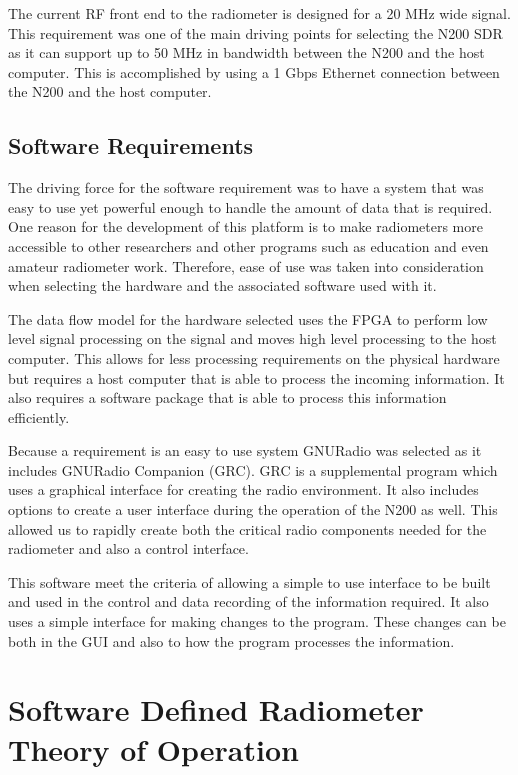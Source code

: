 The current RF front end to the radiometer is designed for a 20 MHz wide signal.  This requirement was one of the main driving points for selecting the N200 SDR as it can support up to 50 MHz in bandwidth between the N200 and the host computer.  This is accomplished by using a 1 Gbps Ethernet connection between the N200 and the host computer.

\subsection{Software Requirements}

The driving force for the software requirement was to have a system that was easy to use yet powerful enough to handle the amount of data that is required.  One reason for the development of this platform is to make radiometers more accessible to other researchers and other programs such as education and even amateur radiometer work.  Therefore, ease of use was taken into consideration when selecting the hardware and the associated software used with it.

The data flow model for the hardware selected uses the FPGA to perform low level signal processing on the signal and moves high level processing to the host computer.  This allows for less processing requirements on the physical hardware but requires a host computer that is able to process the incoming information.  It also requires a software package that is able to process this information efficiently. 

Because a requirement is an easy to use system GNURadio was selected as it includes GNURadio Companion (GRC). GRC is a supplemental program which uses a graphical interface for creating the radio environment.  It also includes options to create a user interface during the operation of the N200 as well.  This allowed us to rapidly create both the critical radio components needed for the radiometer and also a control interface.

This software meet the criteria of allowing a simple to use interface to be built and used in the control and data recording of the information required.  It also uses a simple interface for making changes to the program.  These changes can be both in the GUI and also to how the program processes the information.

\section{Software Defined Radiometer Theory of Operation}


